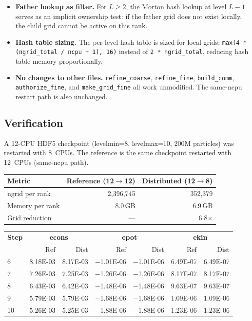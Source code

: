 \documentclass[11pt,fleqn]{book}
\begin{document}
\begin{itemize}
  \item \textbf{Father lookup as filter.}
    For $L \geq 2$, the Morton hash lookup at level $L-1$ serves as an implicit ownership test: if the father grid does not exist locally, the child grid cannot be active on this rank.
  \item \textbf{Hash table sizing.}
    The per-level hash table is sized for local grids: \texttt{max(4 * (ngrid\_total / ncpu + 1), 16)} instead of \texttt{2 * ngrid\_total}, reducing hash table memory proportionally.
  \item \textbf{No changes to other files.}
    \texttt{refine\_coarse}, \texttt{refine\_fine}, \texttt{build\_comm}, \texttt{authorize\_fine}, and \texttt{make\_grid\_fine} all work unmodified.
    The same-ncpu restart path is also unchanged.
\end{itemize}

\subsection{Verification}

A 12-CPU HDF5 checkpoint (levelmin=8, levelmax=10, 200M particles) was restarted with 8~CPUs.  The reference is the same checkpoint restarted with 12~CPUs (same-ncpu path).

\begin{center}
\begin{tabular}{lrr}
\toprule
\textbf{Metric} & \textbf{Reference (12$\to$12)} & \textbf{Distributed (12$\to$8)} \\
\midrule
ngrid per rank       & 2,396,745    & 352,379   \\
Memory per rank      & 8.0\,GB      & 6.9\,GB   \\
Grid reduction       & ---          & 6.8$\times$ \\
\bottomrule
\end{tabular}
\end{center}

\begin{center}
\begin{tabular}{lrrrrrr}
\toprule
\textbf{Step} & \multicolumn{2}{c}{\textbf{econs}} & \multicolumn{2}{c}{\textbf{epot}} & \multicolumn{2}{c}{\textbf{ekin}} \\
 & Ref & Dist & Ref & Dist & Ref & Dist \\
\midrule
6  & 8.18E-03 & 8.17E-03 & $-$1.01E-06 & $-$1.01E-06 & 6.49E-07 & 6.49E-07 \\
7  & 7.26E-03 & 7.25E-03 & $-$1.26E-06 & $-$1.26E-06 & 8.17E-07 & 8.17E-07 \\
8  & 6.43E-03 & 6.42E-03 & $-$1.48E-06 & $-$1.48E-06 & 9.63E-07 & 9.63E-07 \\
9  & 5.79E-03 & 5.79E-03 & $-$1.68E-06 & $-$1.68E-06 & 1.09E-06 & 1.09E-06 \\
10 & 5.26E-03 & 5.25E-03 & $-$1.88E-06 & $-$1.88E-06 & 1.23E-06 & 1.23E-06 \\
\bottomrule
\end{tabular}
\end{center}
\end{document}
